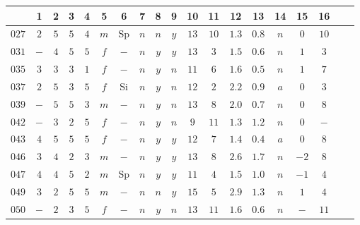 \begin{table}
\centering
\begin{tabular}{|c||c|c|c|c|c|c|c|c|c|c|c|c|c|c|c|c|c|c|}\hline
 & 1  &  2  &  3  &  4 & 5 & 6 & 7 & 8 & 9 & 10 & 11 & 12 & 13 & 14 & 15 & 16   \\ \hline\hline
\textbf{$027$} & $2$ & $5$ & $5$ & $4$ & $m$ & Sp & $n$ & $n$ & $y$ & $13$ & $10$ & $1.3$ & $0.8$ & $n$ & $0$ & $10$ \\ \hline
\textbf{$031$} & $-$ & $4$ & $5$ & $5$ & $f$ & $-$ & $n$ & $y$ & $y$ & $13$ & $3$ & $1.5$ & $0.6$ & $n$ & $1$ & $3$ \\ \hline
\textbf{$035$} & $3$ & $3$ & $3$ & $1$ & $f$ & $-$ & $n$ & $y$ & $n$ & $11$ & $6$ & $1.6$ & $0.5$ & $n$ & $1$ & $7$ \\ \hline
\textbf{$037$} & $2$ & $5$ & $3$ & $5$ & $f$ & Si & $n$ & $y$ & $n$ & $12$ & $2$ & $2.2$ & $0.9$ & $a$ & $0$ & $3$  \\ \hline
\textbf{$039$} & $-$ & $5$ & $5$ & $3$ & $m$ & $-$ & $n$ & $y$ & $n$ & $13$ & $8$ & $2.0$ & $0.7$ & $n$ & $0$ & $8$ \\ \hline
\textbf{$042$} & $-$ & $3$ & $2$ & $5$ & $f$ & $-$ & $n$ & $y$ & $n$ & $9$ & $11$ & $1.3$ & $1.2$ & $n$ & $0$ & $-$ \\ \hline
\textbf{$043$} & $4$ & $5$ & $5$ & $5$ & $f$ & $-$ & $n$ & $y$ & $y$ & $12$ & $7$ & $1.4$ & $0.4$ & $a$ & $0$ & $8$  \\ \hline
\textbf{$046$} & $3$ & $4$ & $2$ & $3$ & $m$ & $-$ & $n$ & $y$ & $y$ & $13$ & $8$ & $2.6$ & $1.7$ & $n$ & $-2$ & $8$ \\ \hline
\textbf{$047$} & $4$ & $4$ & $5$ & $2$ & $m$ & Sp & $n$ & $y$ & $y$ & $11$ & $4$ & $1.5$ & $1.0$ & $n$ & $-1$ & $4$ \\ \hline
\textbf{$049$} & $3$ & $2$ & $5$ & $5$ & $m$ & $-$ & $n$ & $n$ & $y$ & $15$ & $5$ & $2.9$ & $1.3$ & $n$ & $1$ & $4$ \\ \hline
\textbf{$050$} & $-$ & $2$ & $3$ & $5$ & $f$ & $-$ & $n$ & $y$ & $n$ & $13$ & $11$ & $1.6$ & $0.6$ & $n$ & $-$ & $11$ \\ \hline

\end{tabular}
\end{table}
